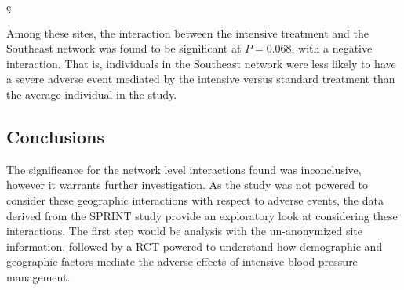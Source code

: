 ç\documentclass[10pt]{article}
\begin{document}
Among these sites, the interaction between the intensive treatment and the
Southeast network was found to be significant at $P = 0.068$, with a negative
interaction. That is, individuals in the Southeast network were less likely to
have a severe adverse event mediated by the intensive versus standard treatment
than the average individual in the study.

\subsection{Conclusions}
The significance for the network level interactions found was inconclusive,
however it warrants further investigation. As the study was not powered to
consider these geographic interactions with respect to adverse events, the data
derived from the SPRINT study provide an exploratory look at considering these
interactions. The first step would be analysis with the un-anonymized site
information, followed by a RCT powered to understand how demographic and
geographic factors mediate the adverse effects of intensive blood pressure
management.
\end{document}
